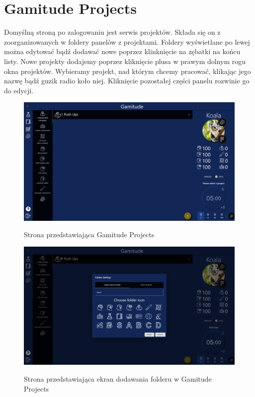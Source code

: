 \documentclass[a4paper,11pt]{report}
\begin{document}
\section{Gamitude Projects}
Domyślną stroną po zalogowaniu jest serwis projektów.
Składa się on z zoorganizowanych w foldery panelów z projektami.
Foldery wyświetlane po lewej można edytować bądź dodawać nowe poprzez klinknięcie na zębatki na końcu listy.
Nowe projekty dodajemy poprzez kliknięcie plusa w prawym dolnym rogu okna projektów.
Wybieramy projekt, nad którym chcemy pracować, klikając jego nazwę bądź guzik radio koło niej.
Kliknięcie pozostałej części panelu rozwinie go do edycji.
\begin{figure}[H]
	\centering
	\includegraphics[scale=0.3]{prezentacja/Projects}\\
	\caption{Strona przedstawiająca Gamitude Projects}
	\label{fig:Projects}
\end{figure}
\begin{figure}[H]
	\centering
	\includegraphics[scale=0.3]{prezentacja/Folders_add}\\
	\caption{Strona przedstawiająca ekran dodawania folderu w Gamitude Projects}
	\label{fig:Folders_add}
\end{figure}
\end{document}
